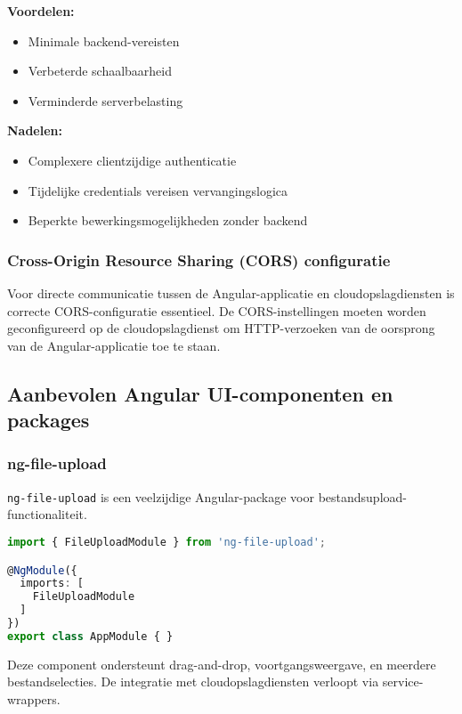 \textbf{Voordelen:}
\begin{itemize}
    \item Minimale backend-vereisten
    \item Verbeterde schaalbaarheid
    \item Verminderde serverbelasting
\end{itemize}

\textbf{Nadelen:}
\begin{itemize}
    \item Complexere clientzijdige authenticatie
    \item Tijdelijke credentials vereisen vervangingslogica
    \item Beperkte bewerkingsmogelijkheden zonder backend
\end{itemize}

\subsubsection{Cross-Origin Resource Sharing (CORS) configuratie}

Voor directe communicatie tussen de Angular-applicatie en cloudopslagdiensten is correcte CORS-configuratie essentieel. De CORS-instellingen moeten worden geconfigureerd op de cloudopslagdienst om HTTP-verzoeken van de oorsprong van de Angular-applicatie toe te staan.

\subsection{Aanbevolen Angular UI-componenten en packages}

\subsubsection{ng-file-upload}

\texttt{ng-file-upload} is een veelzijdige Angular-package voor bestandsupload-functionaliteit.

\begin{lstlisting}[language=TypeScript, caption=Integratie van ng-file-upload]
import { FileUploadModule } from 'ng-file-upload';

@NgModule({
  imports: [
    FileUploadModule
  ]
})
export class AppModule { }
\end{lstlisting}

Deze component ondersteunt drag-and-drop, voortgangsweergave, en meerdere bestandselecties. De integratie met cloudopslagdiensten verloopt via service-wrappers.

